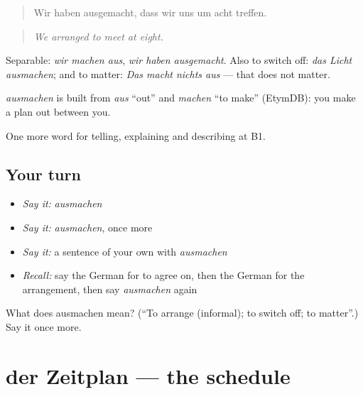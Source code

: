 \begin{quote}
Wir haben ausgemacht, dass wir uns um acht treffen.
\end{quote}

\begin{quote}
\emph{We arranged to meet at eight.}
\end{quote}

Separable: \emph{wir machen aus}, \emph{wir haben ausgemacht}. Also to switch off: \emph{das Licht ausmachen}; and to matter: \emph{Das macht nichts aus} — that does not matter.

\begin{cousinweb}
\emph{ausmachen} is built from \emph{aus} \textquotedblleft{}out\textquotedblright{} and \emph{machen} \textquotedblleft{}to make\textquotedblright{} (EtymDB): you make a plan out between you.
\end{cousinweb}

\begin{grammarlens}[title={What you've built}]
One more word for telling, explaining and describing at B1.
\end{grammarlens}

\subsection*{Your turn}
\begin{itemize}
\raggedright
  \item \emph{Say it:} \emph{ausmachen}
  \item \emph{Say it:} \emph{ausmachen}, once more
  \item \emph{Say it:} a sentence of your own with \emph{ausmachen}
  \item \emph{Recall:} say the German for to agree on, then the German for the arrangement, then say \emph{ausmachen} again
\end{itemize}

\begin{tcolorbox}[breakable,colback=teal!4,colframe=teal!35!black,title={Before you move on}]
What does ausmachen mean? (\textquotedblleft{}To arrange (informal); to switch off; to matter\textquotedblright{}.) Say it once more.
\end{tcolorbox}
\section[der Zeitplan]{der Zeitplan — the schedule}

\label{lesson:GE-C372-zeitplan}



